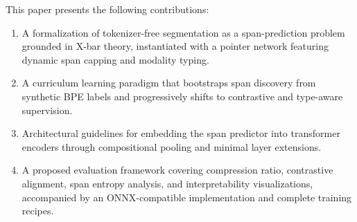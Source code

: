 This paper presents the following contributions:
\begin{enumerate}
  \item A formalization of tokenizer-free segmentation as a span-prediction problem grounded in X-bar theory, instantiated with a pointer network featuring dynamic span capping and modality typing.
  \item A curriculum learning paradigm that bootstraps span discovery from synthetic BPE labels and progressively shifts to contrastive and type-aware supervision.
  \item Architectural guidelines for embedding the span predictor into transformer encoders through compositional pooling and minimal layer extensions.
  \item A proposed evaluation framework covering compression ratio, contrastive alignment, span entropy analysis, and interpretability visualizations, accompanied by an ONNX-compatible implementation and complete training recipes.
\end{enumerate}